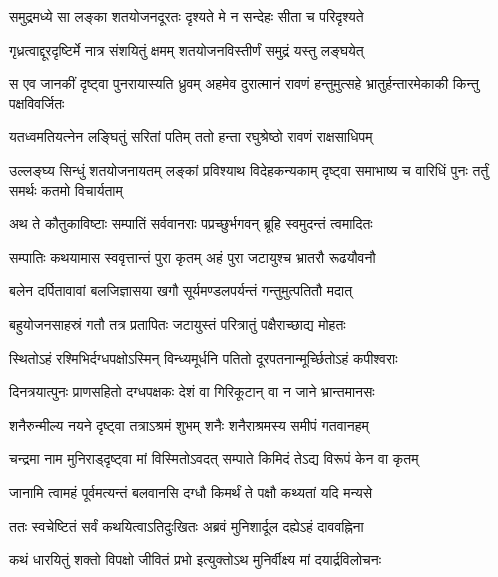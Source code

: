 \twolineshloka
{समुद्रमध्ये सा लङ्का शतयोजनदूरतः}
{दृश्यते मे न सन्देहः सीता च परिदृश्यते} %

\twolineshloka
{गृध्रत्वाद्दूरदृष्टिर्मे नात्र संशयितुं क्षमम्}
{शतयोजनविस्तीर्णं समुद्रं यस्तु लङ्घयेत्} %

\threelineshloka
{स एव जानकीं दृष्ट्वा पुनरायास्यति ध्रुवम्}
{अहमेव दुरात्मानं रावणं हन्तुमुत्सहे}
{भ्रातुर्हन्तारमेकाकी किन्तु पक्षविवर्जितः} %

\twolineshloka
{यतध्वमतियत्नेन लङ्घितुं सरितां पतिम्}
{ततो हन्ता रघुश्रेष्ठो रावणं राक्षसाधिपम्} %

\fourlineindentedshloka
{उल्लङ्घ्य सिन्धुं शतयोजनायतम्}
{लङ्कां प्रविश्याथ विदेहकन्यकाम्}
{दृष्ट्वा समाभाष्य च वारिधिं पुनः}
{तर्तुं समर्थः कतमो विचार्यताम्} %





\twolineshloka
{अथ ते कौतुकाविष्टाः सम्पातिं सर्ववानराः}
{पप्रच्छुर्भगवन् ब्रूहि स्वमुदन्तं त्वमादितः} %

\twolineshloka
{सम्पातिः कथयामास स्ववृत्तान्तं पुरा कृतम्}
{अहं पुरा जटायुश्च भ्रातरौ रूढयौवनौ} %

\twolineshloka
{बलेन दर्पितावावां बलजिज्ञासया खगौ}
{सूर्यमण्डलपर्यन्तं गन्तुमुत्पतितौ मदात्} %

\twolineshloka
{बहुयोजनसाहस्रं गतौ तत्र प्रतापितः}
{जटायुस्तं परित्रातुं पक्षैराच्छाद्य मोहतः} %

\twolineshloka
{स्थितोऽहं रश्मिभिर्दग्धपक्षोऽस्मिन् विन्ध्यमूर्धनि}
{पतितो दूरपतनान्मूर्च्छितोऽहं कपीश्वराः} %

\twolineshloka
{दिनत्रयात्पुनः प्राणसहितो दग्धपक्षकः}
{देशं वा गिरिकूटान् वा न जाने भ्रान्तमानसः} %

\twolineshloka
{शनैरुन्मील्य नयने दृष्ट्वा तत्राऽश्रमं शुभम्}
{शनैः शनैराश्रमस्य समीपं गतवानहम्} %

\twolineshloka
{चन्द्रमा नाम मुनिराड्\mbox{}दृष्ट्वा मां विस्मितोऽवदत्}
{सम्पाते किमिदं तेऽद्य विरूपं केन वा कृतम्} %

\twolineshloka
{जानामि त्वामहं पूर्वमत्यन्तं बलवानसि}
{दग्धौ किमर्थं ते पक्षौ कथ्यतां यदि मन्यसे} %

\twolineshloka
{ततः स्वचेष्टितं सर्वं कथयित्वाऽतिदुःखितः}
{अब्रवं मुनिशार्दूल दह्येऽहं दाववह्निना} %

\twolineshloka
{कथं धारयितुं शक्तो विपक्षो जीवितं प्रभो}
{इत्युक्तोऽथ मुनिर्वीक्ष्य मां दयार्द्रविलोचनः} %

